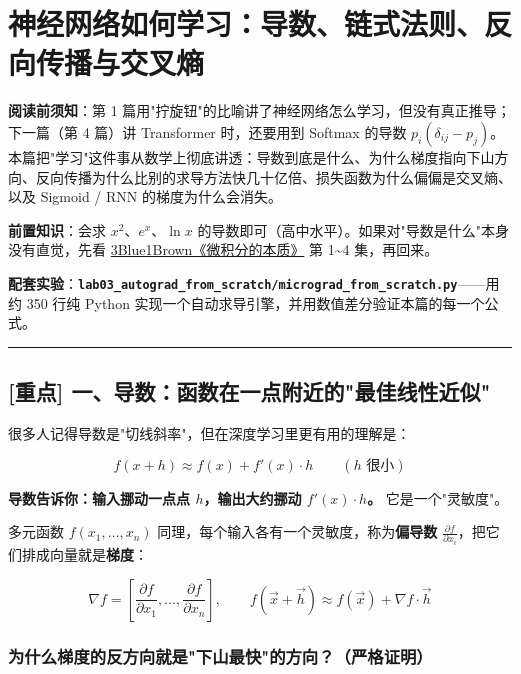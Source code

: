 \chapter{神经网络如何学习：导数、链式法则、反向传播与交叉熵}

\begin{mathBox}[核心数学定理推导]
\textbf{阅读前须知}：第 1 篇用"拧旋钮"的比喻讲了神经网络怎么学习，但没有真正推导；下一篇（第 4 篇）讲 Transformer 时，还要用到 Softmax 的导数 $p_i(\delta_{ij} - p_j)$。本篇把"学习"这件事从数学上彻底讲透：导数到底是什么、为什么梯度指向下山方向、反向传播为什么比别的求导方法快几十亿倍、损失函数为什么偏偏是交叉熵、以及 Sigmoid / RNN 的梯度为什么会消失。

\textbf{前置知识}：会求 $x^2$、$e^x$、$\ln x$ 的导数即可（高中水平）。如果对"导数是什么"本身没有直觉，先看 \href{https://www.3blue1brown.com/topics/calculus}{3Blue1Brown《微积分的本质》} 第 1\textasciitilde{}4 集，再回来。

\textbf{配套实验}：\textbf{\texttt{lab03\_autograd\_from\_scratch/micrograd\_from\_scratch.py}}——用约 350 行纯 Python 实现一个自动求导引擎，并用数值差分验证本篇的每一个公式。
\end{mathBox}

\vspace{0.8em}\hrule\vspace{0.8em}

\section{[重点] 一、导数：函数在一点附近的"最佳线性近似"}

很多人记得导数是"切线斜率"，但在深度学习里更有用的理解是：

\[
f(x + h) \approx f(x) + f'(x) \cdot h \qquad (h \text{ 很小})
\]

\textbf{导数告诉你：输入挪动一点点 $h$，输出大约挪动 $f'(x) \cdot h$。} 它是一个"灵敏度"。

多元函数 $f(x_1, \dots, x_n)$ 同理，每个输入各有一个灵敏度，称为\textbf{偏导数} $\frac{\partial f}{\partial x_i}$，把它们排成向量就是\textbf{梯度}：

\[
\nabla f = \left[\frac{\partial f}{\partial x_1}, \dots, \frac{\partial f}{\partial x_n}\right], \qquad f(\vec{x} + \vec{h}) \approx f(\vec{x}) + \nabla f \cdot \vec{h}
\]

\subsection{为什么梯度的反方向就是"下山最快"的方向？（严格证明）}

